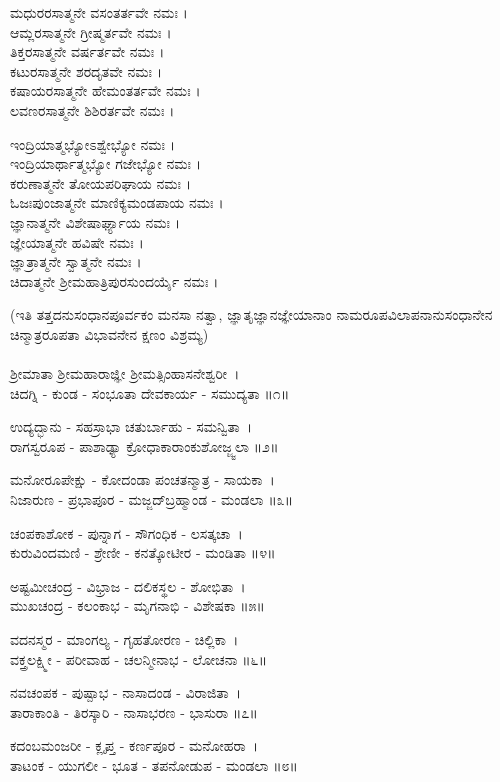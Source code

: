 ಮಧುರರಸಾತ್ಮನೇ ವಸಂತರ್ತವೇ ನಮಃ ।\\
ಆಮ್ಲರಸಾತ್ಮನೇ ಗ್ರೀಷ್ಮರ್ತವೇ ನಮಃ ।\\
ತಿಕ್ತರಸಾತ್ಮನೇ ವರ್ಷರ್ತವೇ ನಮಃ ।\\
ಕಟುರಸಾತ್ಮನೇ ಶರದೃತವೇ ನಮಃ ।\\
ಕಷಾಯರಸಾತ್ಮನೇ ಹೇಮಂತರ್ತವೇ ನಮಃ ।\\
ಲವಣರಸಾತ್ಮನೇ ಶಿಶಿರರ್ತವೇ ನಮಃ ।

ಇಂದ್ರಿಯಾತ್ಮಭ್ಯೋಽಶ್ವೇಭ್ಯೋ ನಮಃ ।\\
ಇಂದ್ರಿಯಾರ್ಥಾತ್ಮಭ್ಯೋ ಗಜೇಭ್ಯೋ ನಮಃ ।\\
ಕರುಣಾತ್ಮನೇ ತೋಯಪರಿಘಾಯ ನಮಃ ।\\
ಓಜಃಪುಂಜಾತ್ಮನೇ ಮಾಣಿಕ್ಯಮಂಡಪಾಯ ನಮಃ ।\\
ಜ್ಞಾನಾತ್ಮನೇ ವಿಶೇಷಾರ್ಘ್ಯಾಯ ನಮಃ ।\\
ಜ್ಞೇಯಾತ್ಮನೇ ಹವಿಷೇ ನಮಃ ।\\
ಜ್ಞಾತ್ರಾತ್ಮನೇ ಸ್ವಾತ್ಮನೇ ನಮಃ ।\\
ಚಿದಾತ್ಮನೇ ಶ್ರೀಮಹಾತ್ರಿಪುರಸುಂದರ್ಯೈ ನಮಃ ।

(ಇತಿ ತತ್ತದನುಸಂಧಾನಪೂರ್ವಕಂ ಮನಸಾ ನತ್ವಾ, ಜ್ಞಾತೃಜ್ಞಾನಜ್ಞೇಯಾನಾಂ ನಾಮರೂಪವಿಲಾಪನಾನುಸಂಧಾನೇನ ಚಿನ್ಮಾತ್ರರೂಪತಾ ವಿಭಾವನೇನ ಕ್ಷಣಂ ವಿಶ್ರಮ್ಯ)\\
 \\
ಶ್ರೀಮಾತಾ ಶ್ರೀಮಹಾರಾಜ್ಞೀ ಶ್ರೀಮತ್ಸಿಂಹಾಸನೇಶ್ವರೀ~।\\
ಚಿದಗ್ನಿ - ಕುಂಡ - ಸಂಭೂತಾ ದೇವಕಾರ್ಯ - ಸಮುದ್ಯತಾ ॥೧॥

ಉದ್ಯದ್ಭಾನು - ಸಹಸ್ರಾಭಾ ಚತುರ್ಬಾಹು - ಸಮನ್ವಿತಾ~।\\
ರಾಗಸ್ವರೂಪ - ಪಾಶಾಢ್ಯಾ ಕ್ರೋಧಾಕಾರಾಂಕುಶೋಜ್ಜ್ವಲಾ ॥೨॥

ಮನೋರೂಪೇಕ್ಷು - ಕೋದಂಡಾ ಪಂಚತನ್ಮಾತ್ರ - ಸಾಯಕಾ~।\\
ನಿಜಾರುಣ - ಪ್ರಭಾಪೂರ - ಮಜ್ಜದ್‍ಬ್ರಹ್ಮಾಂಡ - ಮಂಡಲಾ ॥೩॥

ಚಂಪಕಾಶೋಕ - ಪುನ್ನಾಗ - ಸೌಗಂಧಿಕ - ಲಸತ್ಕಚಾ~।\\
ಕುರುವಿಂದಮಣಿ - ಶ್ರೇಣೀ - ಕನತ್ಕೋಟೀರ - ಮಂಡಿತಾ ॥೪॥

ಅಷ್ಟಮೀಚಂದ್ರ - ವಿಭ್ರಾಜ - ದಲಿಕಸ್ಥಲ - ಶೋಭಿತಾ~।\\
ಮುಖಚಂದ್ರ - ಕಲಂಕಾಭ - ಮೃಗನಾಭಿ - ವಿಶೇಷಕಾ ॥೫॥

ವದನಸ್ಮರ - ಮಾಂಗಲ್ಯ - ಗೃಹತೋರಣ - ಚಿಲ್ಲಿಕಾ~।\\
ವಕ್ತ್ರಲಕ್ಷ್ಮೀ - ಪರೀವಾಹ - ಚಲನ್ಮೀನಾಭ - ಲೋಚನಾ ॥೬॥

ನವಚಂಪಕ - ಪುಷ್ಪಾಭ - ನಾಸಾದಂಡ - ವಿರಾಜಿತಾ~।\\
ತಾರಾಕಾಂತಿ - ತಿರಸ್ಕಾರಿ - ನಾಸಾಭರಣ - ಭಾಸುರಾ ॥೭॥

ಕದಂಬಮಂಜರೀ - ಕ್ಲೃಪ್ತ - ಕರ್ಣಪೂರ - ಮನೋಹರಾ~।\\
ತಾಟಂಕ - ಯುಗಲೀ - ಭೂತ - ತಪನೋಡುಪ - ಮಂಡಲಾ ॥೮॥

